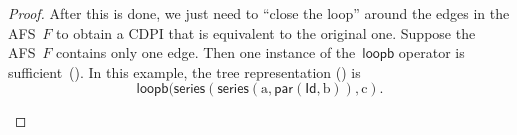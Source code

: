 \documentclass[twocolumn,english]{IEEEtran}
\theoremstyle{definition}
\theoremstyle{plain}
\theoremstyle{definition}
\theoremstyle{remark}
\theoremstyle{definition}
\theoremstyle{plain}
\theoremstyle{plain}
\newcommand{\idFunc}{\aword{Id}}
\newcommand{\aword}[1]{\mathsf{#1}}
\newcommand{\vmath}[1]{\aword{#1}}
\newcommand{\dpseries}{\vmath{series}}
\newcommand{\dppar}{\vmath{par}}
\newcommand{\dploopb}{\vmath{loopb}}
\begin{document}
\begin{proof}
After this is done, we just need to ``close the loop'' around the
edges in the AFS~$F$ to obtain a CDPI that is equivalent to the
original one. Suppose the AFS~$F$ contains only one edge. Then one
instance of the~$\dploopb$ operator is sufficient~().
In this example, the tree representation () is
\[
\dploopb(\dpseries(\dpseries(\text{a},\dppar(\idFunc,\text{b})),\text{c}).
\]

\begin{figure}[H]
\hfill{}\hfill{}\hfill{}


\end{figure}
\end{proof}
\end{document}
